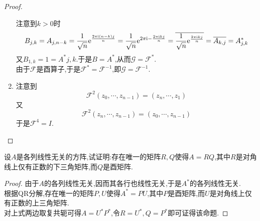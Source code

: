 \documentclass{ctexart}
\begin{document}
\begin{proof}
\begin{enumerate}[label=\tbf{(\arabic*)}]
            注意到$k>0$时
            \[B_{j,k}=A_{j,n-k}=\dfrac{1}{\sqrt n}\mathrm{e}^{\frac{2\pi\text{i}(n-k)j}{n}}=\dfrac{1}{\sqrt n}\mathrm{e}^{2\pi\text{i}-\frac{2\pi\text{i} kj}{n}}=\overline{\dfrac{1}{\sqrt n}\mathrm{e}^{\frac{2\pi\text{i} kj}{n}}}=\overline{A_{k,j}}=A^*_{j,k}\]
            又$B_{1,k}=1=A^*{j,k}$.于是$B=A^*$,从而$\mathcal{G}=\mathcal{F}^*$.\\
            由于$\mathcal{F}$是酉算子,于是$\mathcal{F}^*=\mathcal{F}^{-1}$,即$\mathcal{G}=\mathcal{F}^{-1}$.
        \item 注意到
            \[\mathcal{F}^2(z_0,\cdots,z_{n-1})=(z_{n},\cdots,z_1)\]
            又
            \[\mathcal{F}^2(z_n,\cdots,z_{n-1})=(z_0,\cdots,z_{n-1})\]
            于是$\mathcal{F}^4=I$.
    \end{enumerate}
\end{proof}
\begin{problem}[20.]
    设$A$是各列线性无关的方阵,试证明:存在唯一的矩阵$R,Q$使得$A=RQ$,其中$R$是对角线上仅有正数的下三角矩阵,而$Q$是酉矩阵.
\end{problem}
\begin{proof}
    由于$A$的各列线性无关,因而其各行也线性无关,于是$A^*$的各列线性无关.\\
    根据QR分解,存在唯一的矩阵$P,U$使得$A^*=PU$,其中$P$是酉矩阵,而$U$是对角线上仅有正数的上三角矩阵.\\
    对上式两边取复共轭可得$A=U^*P^*$,令$R=U^*,Q=P^*$即可证得该命题.
\end{proof}
\end{document}
